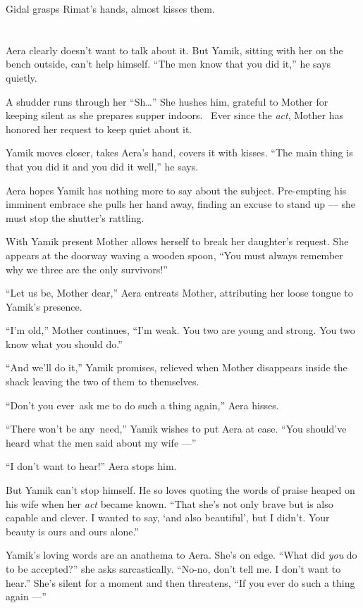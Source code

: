 \documentclass[twoside,11pt,openany]{book}
\begin{document}
Gidal grasps Rimat's hands, almost kisses them.


\bigskip

\chapter{}

Aera clearly doesn't want to talk about it. But Yamik, sitting with her on the bench outside, can't help
himself.  ``The men know that you did it,'' he says quietly.

A shudder runs through her ``Sh{\ldots}''  She hushes him, grateful to Mother for keeping
silent as she prepares supper indoors.~ Ever since the \textit{act}, Mother
has honored her request to keep quiet
about it.

Yamik moves closer, takes Aera's hand, covers it with kisses. ``The main thing is that you did it and you
did it well,'' he says.

Aera hopes Yamik has nothing more to say about the subject. Pre-empting his imminent embrace she pulls her hand away,
finding an excuse to stand up --- she must stop the shutter's rattling.

With Yamik present Mother allows herself to break her daughter's request. She appears at the doorway waving a wooden
spoon, ``You must always remember why we three are the only survivors!''

``Let us be, Mother dear,'' Aera entreats Mother, attributing her loose tongue to Yamik's
presence.

``I'm old,'' Mother continues, ``I'm weak. You two are young and strong. You two
know what you should do.''

``And we'll do it,'' Yamik promises, relieved when Mother disappears inside the shack leaving
the two of them to themselves.

``Don't you ever~ask me to do such a thing again,'' Aera hisses.

``There won't be any~need,'' Yamik wishes to put Aera at ease. ``You should've
heard what the men said about my wife ---''

``I don't want to hear!''  Aera stops him.

But Yamik can't stop himself. He so loves quoting the words of praise heaped on his wife when her \textit{act} became
known. ``That she's not only brave but is also capable and clever. I wanted to say, `and also beautiful',
but I didn't. Your beauty is ours and ours alone.''

Yamik's loving words are an anathema to Aera. She's on edge. ``What did \textit{you} do to be
accepted?'' she asks sarcastically. ``No-no, don't tell me. I don't want to
hear.'' She's silent for a moment and then threatens, ``If you ever do such a thing again
---''
\end{document}
